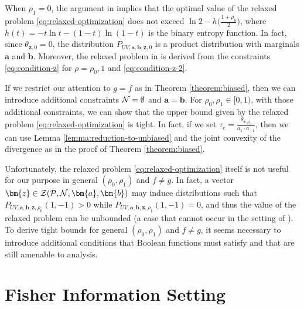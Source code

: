 \documentclass[journal,draftcls, onecolumn]{IEEEtran}
\begin{document}
When $\rho_1=0$, the argument in \cite{PicPiaMat:18,Pichler:thesis} implies that the optimal value of the 
relaxed problem \eqref{eq:relaxed-optimization} does not exceed $\ln 2 - h\big(\frac{1+\rho_0}{2}\big)$,
where $h(t)=-t\ln t-(1-t)\ln(1-t)$ is the binary entropy function. 
In fact, since $\theta_{\bm{z},0}=0$, the distribution $P_{UV, \bm{a},\bm{b},\bm{z},0}$ is a product distribution with marginals $\bm{a}$ and $\bm{b}$.
Moreover, 
the relaxed problem in \cite{PicPiaMat:18,Pichler:thesis} is derived from
the constraints \eqref{eq:condition-z} for $\rho=\rho_0,1$ and \eqref{eq:condition-z-2}. 

If we restrict our attention to $g=f$ as in Theorem \ref{theorem:biased},
then we can introduce additional constraints ${\cal N}=\emptyset$ and $\bm{a}=\bm{b}$.
For $\rho_0,\rho_1\in[0,1)$, with those additional constraints, 
we can show that the upper bound given by the relaxed problem \eqref{eq:relaxed-optimization} is tight. 
In fact, if we set $\tau_c = \frac{\theta_{\bm{z},\rho_c}}{a_1\cdot a_{-1}}$, then
we can use Lemma \ref{lemma:reduction-to-unbiased} and the joint convexity of the divergence
as in the proof of Theorem \ref{theorem:biased}. 

Unfortunately, the relaxed problem \eqref{eq:relaxed-optimization} itself
is not useful for our purpose in general $(\rho_0,\rho_1)$ and $f\neq g$. 
In fact, a vector $\bm{z} \in {\cal Z}({\cal P},{\cal N},\bm{a},\bm{b})$
may induce distributions such that $P_{UV, \bm{a},\bm{b},\bm{z},\rho_0}(1,-1)>0$ while
$P_{UV, \bm{a},\bm{b},\bm{z},\rho_1}(1,-1)=0$, and thus the value of the relaxed problem can be unbounded (a case that cannot occur in the setting of \cite{PicPiaMat:18,Pichler:thesis}). 
To derive tight bounds for general $(\rho_0,\rho_1)$ and $f\neq g$, it seems necessary to introduce 
additional conditions that Boolean functions must satisfy and that are still amenable to analysis. 



\section{Fisher Information Setting} \label{section:Fisher}
\end{document}
